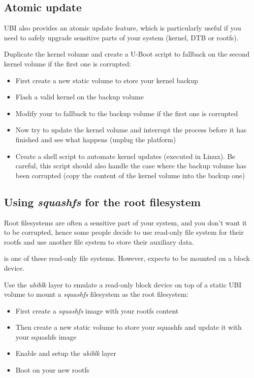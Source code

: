 \subsection{Atomic update}

UBI also provides an atomic update feature, which is particularly useful
if you need to safely upgrade sensitive parts of your system (kernel,
DTB or rootfs).

Duplicate the kernel volume and create a U-Boot script to fallback on
the second kernel volume if the first one is corrupted:
\begin{itemize}
  \item First create a new static volume to store your kernel backup
  \item Flash a valid kernel on the backup volume
  \item Modify your  to fallback to the backup volume if the first one
    is corrupted
  \item Now try to update the kernel volume and interrupt the process before
    it has finished and see what happens (unplug the platform)
  \item Create a shell script to automate kernel updates (executed in Linux).
    Be careful, this script should also handle the case where the backup
    volume has been corrupted (copy the content of the kernel volume into
    the backup one)
\end{itemize}


\subsection{Using {\em squashfs} for the root filesystem}

Root filesystems are often a sensitive part of your system, and you don't
want it to be corrupted, hence some people decide to use read-only
file system for their rootfs and use another file system to store their
auxiliary data.

 is one of these read-only file systems. However,
 expects to be mounted on a block device.

Use the {\em ubiblk} layer to emulate a read-only block device on top
of a static UBI volume to mount a {\em squashfs} filesystem as the
root filesystem:

\begin{itemize}
  \item First create a {\em squashfs} image with your rootfs content
  \item Then create a new static volume to store your squashfs and update it with
    your squashfs image
  \item Enable and setup the {\em ubiblk} layer
  \item Boot on your new rootfs
\end{itemize}

